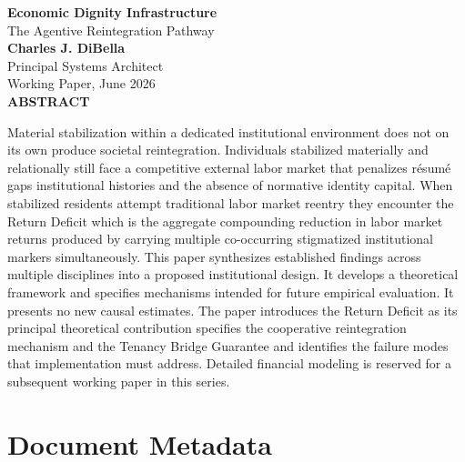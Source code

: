 \documentclass[12pt, letterpaper]{article}
\begin{document}
\captionsetup[table]{labelfont=normalfont, labelsep=period, skip=6pt}

\begin{titlepage}
\begin{center}
{\LARGE \textbf{Economic Dignity Infrastructure}}\\[6pt]
{\large The Agentive Reintegration Pathway}\\[0.5cm]
{\normalsize \textbf{Charles J. DiBella}}\\[0.01cm]
{\normalsize Principal Systems Architect}\\[0.01cm]
{\normalsize Working Paper, June 2026}\\[0.3cm]
\textbf{ABSTRACT}
\vspace{0.2cm}
\end{center}
\begin{minipage}{0.95\textwidth}
\noindent

Material stabilization within a dedicated institutional environment does not on its own produce societal reintegration. Individuals stabilized materially and relationally still face a competitive external labor market that penalizes r\'{e}sum\'{e} gaps institutional histories and the absence of normative identity capital. When stabilized residents attempt traditional labor market reentry they encounter the Return Deficit which is the aggregate compounding reduction in labor market returns produced by carrying multiple co-occurring stigmatized institutional markers simultaneously. This paper synthesizes established findings across multiple disciplines into a proposed institutional design. It develops a theoretical framework and specifies mechanisms intended for future empirical evaluation. It presents no new causal estimates. The paper introduces the Return Deficit as its principal theoretical contribution specifies the cooperative reintegration mechanism and the Tenancy Bridge Guarantee and identifies the failure modes that implementation must address. Detailed financial modeling is reserved for a subsequent working paper in this series.

\end{minipage}
\end{titlepage}


\newpage
\section*{Document Metadata}
\end{document}
